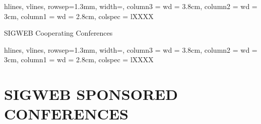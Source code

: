 \documentclass{scrartcl}
\begin{document}
\begin{titlepage}
        \begin{table}[h!]
            \centering
            \begin{tblr}{
                hlines,
                vlines,
                rowsep=1.3mm,
                width=\linewidth,
                column{3} = {wd = 3.8cm},
                column{2} = {wd = 3cm},
                column{1} = {wd = 2.8cm},
                colspec = {lXXXX}
            }
            \end{tblr}
        \end{table}

        \noindent SIGWEB Cooperating Conferences

        \begin{table}[h!]
            \centering
            \begin{tblr}{
                hlines,
                vlines,
                rowsep=1.3mm,
                width=\linewidth,
                column{3} = {wd = 3.8cm},
                column{2} = {wd = 3cm},
                column{1} = {wd = 2.8cm},
                colspec = {lXXXX}
            }
            \end{tblr}
        \end{table}

    \end{titlepage}


    \section*{SIGWEB SPONSORED CONFERENCES}
\end{document}
